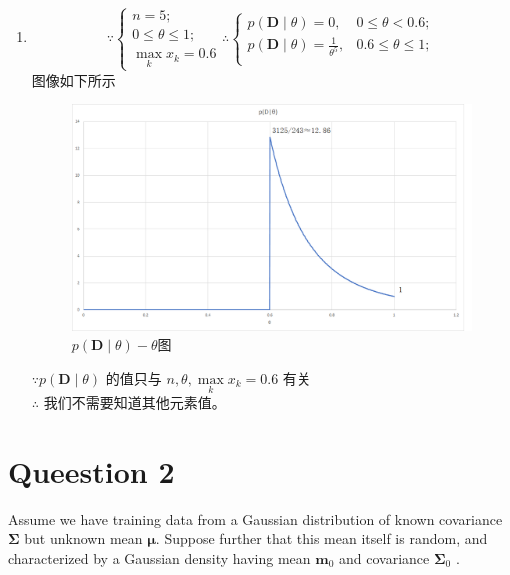 \documentclass[a4paper,11pt,onecolumn,oneside,UTF8]{article}
\begin{document}
\begin{enumerate}
    \item
          $$
              \because \left\{\begin{array}{ll}
                  n = 5;                \\
                  0 \leq \theta \leq 1; \\
                  \mathop{max}\limits_{k} x_k = 0.6
              \end{array}
              \right.
              \therefore \left\{\begin{array}{ll}
                  p\left(\bm D \mid \theta \right) = 0,                  & 0\leq\theta< 0.6;    \\
                  p\left(\bm D \mid \theta \right) = \frac{1}{\theta^5}, & 0.6\leq\theta\leq 1; \\
              \end{array}
              \right.
          $$
          图像如下所示\\
          \begin{figure}[H]
              \centering
              \includegraphics[width=.8\textwidth]{hw2_1.png}            %
              \caption{ $p\left(\bm D \mid \theta \right)-\theta$图 }    %
              \label{img1}                                               %
          \end{figure}
          $\because p\left(\bm D \mid \theta \right)$ 的值只与 $n ,\theta ,\mathop{max}\limits_{k} x_k = 0.6$ 有关\\
          $\therefore$ 我们不需要知道其他元素值。\\

\end{enumerate}


\section*{Queestion 2}
Assume we have training data from a Gaussian distribution of known covariance
$\bm\Sigma$ but unknown mean $\bm\mu$. Suppose further that this mean itself is random, and
characterized by a Gaussian density having mean $\bm m_0$ and covariance $\bm\Sigma_0$ .
\end{document}
